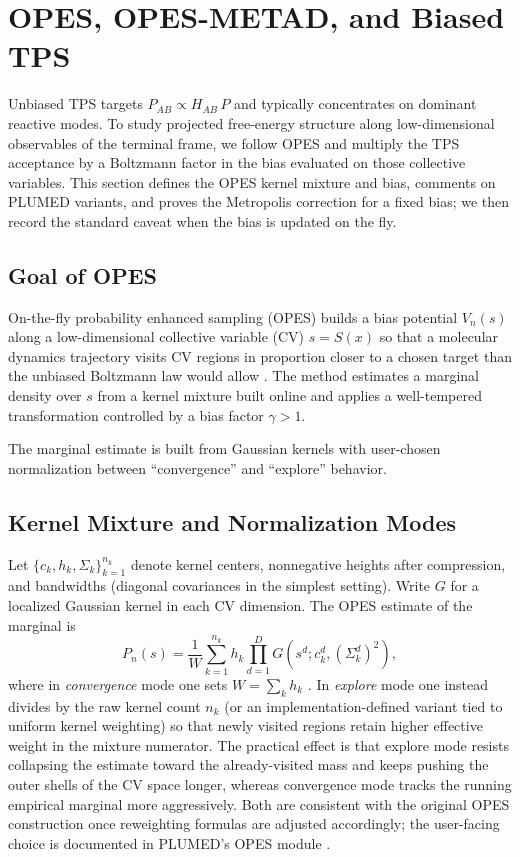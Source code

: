 \section{OPES, OPES-METAD, and Biased TPS}
\label{sec:opes-theory}

Unbiased TPS targets $P_{AB} \propto H_{AB}\,P$ and typically concentrates on
dominant reactive modes. To study projected free-energy structure along
low-dimensional observables of the terminal frame, we follow OPES
\citep{invernizzi2020,invernizzi2022} and multiply the TPS acceptance by a
Boltzmann factor in the bias evaluated on those collective variables. This
section defines the OPES kernel mixture and bias, comments on PLUMED variants,
and proves the Metropolis correction for a fixed bias; we then record the
standard caveat when the bias is updated on the fly.

\subsection{Goal of OPES}

On-the-fly probability enhanced sampling (OPES) builds a bias potential $V_n(s)$ along a low-dimensional collective variable (CV) $s = S(x)$ so that a molecular dynamics trajectory visits CV regions in proportion closer to a chosen target than the unbiased Boltzmann law would allow \citep{invernizzi2020,invernizzi2022}. The method estimates a marginal density over $s$ from a kernel mixture built online and applies a well-tempered transformation controlled by a bias factor $\gamma > 1$.

The marginal estimate is built from Gaussian kernels with user-chosen
normalization between ``convergence'' and ``explore'' behavior.

\subsection{Kernel Mixture and Normalization Modes}

Let $\{c_k, h_k, \Sigma_k\}_{k=1}^{n_k}$ denote kernel centers, nonnegative heights after compression, and bandwidths (diagonal covariances in the simplest setting). Write $G$ for a localized Gaussian kernel in each CV dimension. The OPES estimate of the marginal is
\begin{equation}
  \label{eq:opes-pn}
  P_n(s) = \frac{1}{W} \sum_{k=1}^{n_k} h_k \prod_{d=1}^D G(s^d; c_k^d, (\Sigma_k^d)^2),
\end{equation}
where in \emph{convergence} mode one sets $W = \sum_k h_k$ \citep{invernizzi2022}. In \emph{explore} mode one instead divides by the raw kernel count $n_k$ (or an implementation-defined variant tied to uniform kernel weighting) so that newly visited regions retain higher effective weight in the mixture numerator. The practical effect is that explore mode resists collapsing the estimate toward the already-visited mass and keeps pushing the outer shells of the CV space longer, whereas convergence mode tracks the running empirical marginal more aggressively. Both are consistent with the original OPES construction once reweighting formulas are adjusted accordingly; the user-facing choice is documented in PLUMED's OPES module \citep{plumed2024}.

